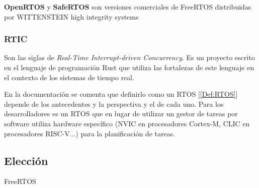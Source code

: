 \textbf{OpenRTOS} y \textbf{SafeRTOS} son versiones comerciales de FreeRTOS distribuidas por WITTENSTEIN high integrity systems

\subsubsection{RTIC}
Son las siglas de \emph{Real-Time Interrupt-driven Concurrency}. Es un proyecto escrito en el lenguaje de programación Rust que utiliza las fortalezas de este lenguaje en el contexto de los sistemas de tiempo real.

En la documentación \cite{RTIC} se comenta que definirlo como un RTOS [\ref{Def:RTOS}] depende de los antecedentes y la perspectiva y el de cada uno. Para los desarrolladores es un RTOS que en lugar de utilizar un gestor de tareas por software utiliza hardware específico (NVIC en procesadores Cortex-M, CLIC en procesadores RISC-V...) para la planificación de tareas.

\subsection{Elección}
FreeRTOS

